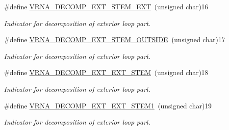 \begin{DoxyCompactItemize}
\#define \hyperlink{group__constraints_gabb09c5b78b75a44502fc77b950125c1e}{V\+R\+N\+A\+\_\+\+D\+E\+C\+O\+M\+P\+\_\+\+E\+X\+T\+\_\+\+S\+T\+E\+M\+\_\+\+E\+XT}~(unsigned char)16
\begin{DoxyCompactList}\small\item\em Indicator for decomposition of exterior loop part. \end{DoxyCompactList}\item 
\mbox{\label{group__constraints_gae7554cd3ff089360c02e4920229e221c}} 
\#define \hyperlink{group__constraints_gae7554cd3ff089360c02e4920229e221c}{V\+R\+N\+A\+\_\+\+D\+E\+C\+O\+M\+P\+\_\+\+E\+X\+T\+\_\+\+S\+T\+E\+M\+\_\+\+O\+U\+T\+S\+I\+DE}~(unsigned char)17
\begin{DoxyCompactList}\small\item\em Indicator for decomposition of exterior loop part. \end{DoxyCompactList}\item 
\#define \hyperlink{group__constraints_ga06efd054c9271438f6d82d4559d9e69f}{V\+R\+N\+A\+\_\+\+D\+E\+C\+O\+M\+P\+\_\+\+E\+X\+T\+\_\+\+E\+X\+T\+\_\+\+S\+T\+EM}~(unsigned char)18
\begin{DoxyCompactList}\small\item\em Indicator for decomposition of exterior loop part. \end{DoxyCompactList}\item 
\#define \hyperlink{group__constraints_ga2e75d7a77118735b32f25422d9686719}{V\+R\+N\+A\+\_\+\+D\+E\+C\+O\+M\+P\+\_\+\+E\+X\+T\+\_\+\+E\+X\+T\+\_\+\+S\+T\+E\+M1}~(unsigned char)19
\begin{DoxyCompactList}\small\item\em Indicator for decomposition of exterior loop part. \end{DoxyCompactList}\end{DoxyCompactItemize}
